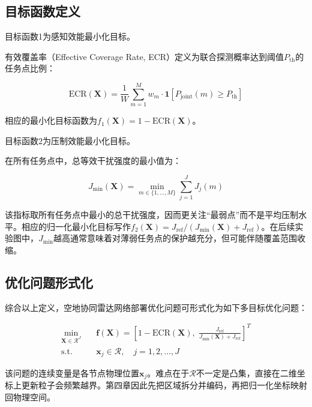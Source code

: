 \subsection{目标函数定义}

目标函数1为感知效能最小化目标。

有效覆盖率（Effective Coverage Rate, ECR）定义为联合探测概率达到阈值$P_{\text{th}}$的任务点比例：

\begin{equation}
\text{ECR}(\mathbf{X}) = \frac{1}{W} \sum_{m=1}^{M} w_m \cdot \mathbf{1}[P_{\text{joint}}(m) \geq P_{\text{th}}]
\label{eq:ecr}
\end{equation}

相应的最小化目标函数为$f_1(\mathbf{X}) = 1 - \text{ECR}(\mathbf{X})$。

目标函数2为压制效能最小化目标。

在所有任务点中，总等效干扰强度的最小值为：

\begin{equation}
J_{\min}(\mathbf{X}) = \min_{m \in \{1,\ldots,M\}} \sum_{j=1}^{J} J_j(m)
\label{eq:jmin}
\end{equation}

该指标取所有任务点中最小的总干扰强度，因而更关注“最弱点”而不是平均压制水平。相应的归一化最小化目标写作$f_2(\mathbf{X})=J_{\text{ref}}/(J_{\min}(\mathbf{X})+J_{\text{ref}})$。在后续实验图中，$J_{\min}$越高通常意味着对薄弱任务点的保护越充分，但可能伴随覆盖范围收缩。

\subsection{优化问题形式化}

综合以上定义，空地协同雷达网络部署优化问题可形式化为如下多目标优化问题：

\begin{equation}
\begin{aligned}
\min_{\mathbf{X} \in \mathcal{R}^J} \quad & \mathbf{f}(\mathbf{X}) = \left[1 - \text{ECR}(\mathbf{X}), \; \frac{J_{\text{ref}}}{J_{\min}(\mathbf{X}) + J_{\text{ref}}}\right]^T \\
\text{s.t.} \quad & \mathbf{x}_j \in \mathcal{R}, \quad j = 1, 2, \ldots, J
\end{aligned}
\label{eq:optimization_problem}
\end{equation}

该问题的连续变量是各节点物理位置$\mathbf{x}_j$。难点在于$\mathcal{R}$不一定是凸集，直接在二维坐标上更新粒子会频繁越界。第四章因此先把区域拆分并编码，再把归一化坐标映射回物理空间。

